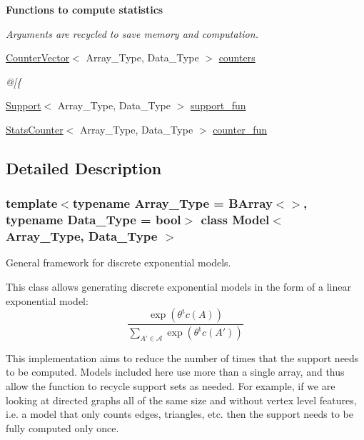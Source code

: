 \begin{Indent}\textbf{ Functions to compute statistics}\par
{\em Arguments are recycled to save memory and computation. }\begin{DoxyCompactItemize}
\item 
\hyperlink{class_counter_vector}{Counter\+Vector}$<$ Array\+\_\+\+Type, Data\+\_\+\+Type $>$ \hyperlink{class_model_a1a711382ab0593f3b54ad549746e9149}{counters}
\begin{DoxyCompactList}\small\item\em @\mbox{[}\{ \end{DoxyCompactList}\item 
\hyperlink{class_support}{Support}$<$ Array\+\_\+\+Type, Data\+\_\+\+Type $>$ \hyperlink{class_model_a192302b6d7402bd4ef6edae623074ad0}{support\+\_\+fun}
\item 
\hyperlink{class_stats_counter}{Stats\+Counter}$<$ Array\+\_\+\+Type, Data\+\_\+\+Type $>$ \hyperlink{class_model_a126cffe699d64e664ba6aa0b1796c780}{counter\+\_\+fun}
\end{DoxyCompactItemize}
\end{Indent}


\subsection{Detailed Description}
\subsubsection*{template$<$typename Array\+\_\+\+Type = B\+Array$<$$>$, typename Data\+\_\+\+Type = bool$>$\newline
class Model$<$ Array\+\_\+\+Type, Data\+\_\+\+Type $>$}

General framework for discrete exponential models. 

This class allows generating discrete exponential models in the form of a linear exponential model\+: \[ \frac{ \exp{\left(\theta^{\mbox{t}}c(A)\right)} }{ \sum_{A'\in \mathcal{A}}\exp{\left(\theta^{\mbox{t}}c(A')\right)} } \]

This implementation aims to reduce the number of times that the support needs to be computed. Models included here use more than a single array, and thus allow the function to recycle support sets as needed. For example, if we are looking at directed graphs all of the same size and without vertex level features, i.\+e. a model that only counts edges, triangles, etc. then the support needs to be fully computed only once. 

